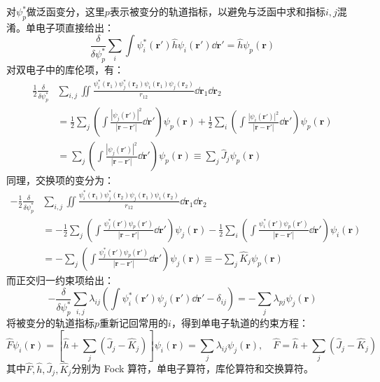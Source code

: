 对$\psi_p^*$做泛函变分，这里$p$表示被变分的轨道指标，以避免与泛函中求和指标$i,j$混淆。单电子项直接给出：
\[\frac{\delta}{\delta \psi_p^*}\sum_i\int \psi_i^*(\bm{r}')\hat{h}\psi_i(\bm{r}')\dd{\bm{r}'}=\hat{h}\psi_p(\bm{r})\]
对双电子中的库伦项，有：
\[\begin{aligned}
\frac{1}{2}\frac{\delta}{\delta \psi_p^*}
&\sum_{i,j}\iint
\frac{\psi_i^*(\bm{r}_1)\psi_j^*(\bm{r}_2)\psi_i(\bm{r}_1)\psi_j(\bm{r}_2)}{r_{12}}
\dd{\bm{r}_1}\dd{\bm{r}_2}\\
&=\frac{1}{2}\sum_j\left(\int\frac{|\psi_j(\bm{r}')|^2}{|\bm{r}-\bm{r}'|}\dd{\bm{r}'}\right)\psi_p(\bm{r})+\frac{1}{2}\sum_i\left(\int\frac{|\psi_i(\bm{r}')|^2}{|\bm{r}-\bm{r}'|}\dd{\bm{r}'}\right)\psi_p(\bm{r})\\
&=\sum_j\left(\int\frac{|\psi_j(\bm{r}')|^2}{|\bm{r}-\bm{r}'|}\dd{\bm{r}'}\right)\psi_p(\bm{r})\equiv\sum_j\hat{J}_j\psi_p(\bm{r})
\end{aligned}\]
同理，交换项的变分为：
\[\begin{aligned}
-\frac{1}{2}\frac{\delta}{\delta \psi_p^*}
&\sum_{i,j}\iint
\frac{\psi_i^*(\bm{r}_1)\psi_j^*(\bm{r}_2)\psi_j(\bm{r}_1)\psi_i(\bm{r}_2)}{r_{12}}
\dd{\bm{r}_1}\dd{\bm{r}_2}\\
&=-\frac{1}{2}\sum_j\left(\int\frac{\psi_j^*(\bm{r}')\psi_p(\bm{r}')}{|\bm{r}-\bm{r}'|}\dd{\bm{r}'}\right)\psi_j(\bm{r})-\frac{1}{2}\sum_i\left(\int\frac{\psi_i^*(\bm{r}')\psi_p(\bm{r}')}{|\bm{r}-\bm{r}'|}\dd{\bm{r}'}\right)\psi_i(\bm{r})\\
&=-\sum_j\left(\int\frac{\psi_j^*(\bm{r}')\psi_p(\bm{r}')}{|\bm{r}-\bm{r}'|}\dd{\bm{r}'}\right)\psi_j(\bm{r})\equiv-\sum_j\hat{K}_j\psi_p(\bm{r})
\end{aligned}\]
而正交归一约束项给出：
\[-\frac{\delta}{\delta \psi_p^*}\sum_{i,j}\lambda_{ij}\left(\int \psi_i^*(\bm{r}')\psi_j(\bm{r}')\dd{\bm{r}'}-\delta_{ij}\right)=-\sum_j\lambda_{pj}\psi_j(\bm{r})\]
将被变分的轨道指标$p$重新记回常用的$i$，得到单电子轨道的约束方程：
\[\hat{F}\psi_i(\bm{r})=\left[\hat{h}+\sum_j(\hat{J}_j-\hat{K}_j)\right]\psi_i(\bm{r})=\sum_j\lambda_{ij}\psi_j(\bm{r}), \quad \hat{F}=\hat{h}+\sum_j(\hat{J}_j-\hat{K}_j)\]
其中$\hat{F},\hat{h},\hat{J}_j,\hat{K}_j$分别为 Fock 算符，单电子算符，库伦算符和交换算符。

